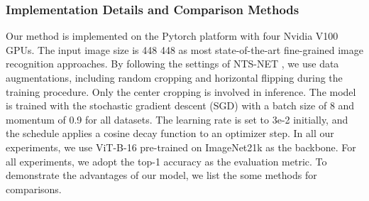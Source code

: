 \documentclass[5p,twocolumn]{elsarticle}
\begin{document}
\subsubsection{\textbf{Implementation Details and Comparison Methods}}
Our method is implemented on the Pytorch platform with four Nvidia V100 GPUs.
The input image size is 448  448 as most state-of-the-art fine-grained image recognition approaches. By following the settings of NTS-NET \cite{Yang2018Learning}, we use data augmentations, including random cropping and horizontal flipping during the training procedure. Only the center cropping is involved in inference. The model is trained with the stochastic gradient descent (SGD) with a batch size of 8 and momentum of 0.9 for all datasets. The learning rate is set to 3e-2 initially, and the schedule applies a cosine decay function to an optimizer step.
In all our experiments, we use ViT-B-16 pre-trained on ImageNet21k as the backbone. For all experiments, we adopt the top-1 accuracy as the evaluation metric.
To demonstrate the advantages of our model, we list the some methods for comparisons.
\end{document}
